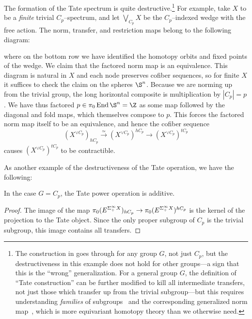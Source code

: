 \begin{example}\label{TateDestruction}
The formation of the Tate spectrum is quite destructive.\footnote{The construction in  goes through for any group \(G\), not just \(C_p\), but the destructiveness in this example does not hold for other groups---a sign that this is the ``wrong'' generalization.  For a general group \(G\), the definition of ``Tate construction'' can be further modified to kill all intermediate transfers, not just those which transfer up from the trivial subgroup---but this requires understanding \textit{families} of subgroups~\cite[Section XXI.4]{MayAlaskaNotes} and the corresponding generalized norm map~\cite[Section XXV.6]{MayAlaskaNotes}, which is more equivariant homotopy theory than we otherwise need.}  For example, take \(X\) to be a \emph{finite} trivial \(C_p\)--spectrum, and let \(\bigvee_{C_p} X\) be the \(C_p\)--indexed wedge with the free action.  The norm, transfer, and restriction maps belong to the following diagram:
\begin{center}
\end{center}
where on the bottom row we have identified the homotopy orbits and fixed points of the wedge.  We claim that the factored norm map is an equivalence.  This diagram is natural in \(X\) and each node preserves cofiber sequences, so for finite \(X\) it suffices to check the claim on the spheres \(\S^n\).  Because we are norming up from the trivial group, the long horizontal composite is multiplication by \(|C_p| = p\).  We have thus factored \(p \in \pi_0 \End \S^n = \Z\) as some map followed by the diagonal and fold maps, which themselves compose to \(p\).  This forces the factored norm map itself to be an equivalence, and hence the cofiber sequence \[(X^{\vee C_p})_{hC_p} \xrightarrow{\simeq} (X^{\vee C_p})^{hC_p} \to (X^{\vee C_p})^{tC_p}\] causes \((X^{\vee C_p})^{tC_p}\) to be contractible.
\end{example}

As another example of the destructiveness of the Tate operation, we have the following:

\begin{lemma}
In the case \(G = C_p\), the Tate power operation is additive.
\end{lemma}
\begin{proof}
The image of the map \(\pi_0 (E^{\Sigma^\infty_+ X})_{hC_p} \to \pi_0 (E^{\Sigma^\infty_+ X})^{hC_p}\) is the kernel of the projection to the Tate object.  Since the only proper subgroup of \(C_p\) is the trivial subgroup, this image contains all transfers.
\end{proof}

